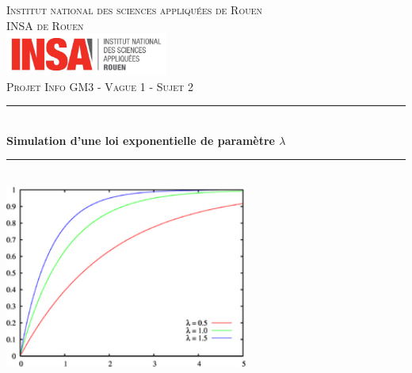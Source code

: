 \documentclass[12,french]{report}
\newcommand{\HRule}{\rule{\linewidth}{0.5mm}}
\begin{document}
\hypersetup{pdfborder=0 0 0}

\begin{titlepage}

\begin{center}
	\textsc{{\LARGE Institut national des sciences appliquées de Rouen} \\ 			\vspace{6mm} {\Large INSA de Rouen}} \\
	\vspace{5mm}
	\includegraphics[width=0.4\textwidth]{./Images/insa}\\[1.0 cm]

	\textsc{\Large Projet Info GM3 - Vague 1 - Sujet 2}\\[0.6cm]

	\HRule \\[0.5cm]
	{ \Huge \bfseries Simulation d'une loi exponentielle de paramètre $\lambda$}\\[0.2cm]
	\HRule \\[0.95cm]

	\includegraphics[width=0.6\textwidth]{./Images/Courbes_loi_exp}\\[0.9 cm]


\end{center}
\end{titlepage}
\end{document}
